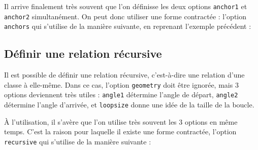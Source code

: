\documentclass[a4paper,11pt]{report}
\newcommand{\inputTikZ}[1]{%
  }%
\newcommand{\inputTikZ}[1]{%
    \texttt{[image: fig/\#1.pdf]}%
  }%
\begin{document}
\begin{center}
\inputTikZ{tikzanchor}
\end{center}

Il arrive finalement très souvent que l'on définisse les deux options {\tt anchor1} et {\tt anchor2} simultanément. On peut donc utiliser une forme contractée : l'option \hypertarget{anchors}{{\tt anchors}} qui s'utilise de la manière suivante, en reprenant l'exemple précédent :

\medskip

\begin{minipage}{0.6\textwidth}

\end{minipage}
\begin{minipage}{0.4\textwidth}
\begin{center}
\inputTikZ{relationanchors}
\end{center}
\end{minipage}

\subsection{Définir une relation récursive}\label{ss.relrec}

Il est possible de définir une relation récursive, c'est-à-dire une relation d'une classe à elle-même. Dans ce cas, l'option {\tt geometry} doit être ignorée, mais 3 options deviennent très utiles : {\tt angle1} détermine l'angle de départ, {\tt angle2} détermine l'angle d'arrivée, et {\tt loopsize} donne une idée de la taille de la boucle.

\medskip

\begin{minipage}{0.5\textwidth}

\end{minipage}
\begin{minipage}{0.4\textwidth}
\begin{center}
\inputTikZ{relationrec}
\end{center}
\end{minipage}

\medskip

\`{A} l'utilisation, il s'avère que l'on utilise très souvent les 3 options en même temps. C'est la raison pour laquelle il existe une forme contractée, l'option {\tt recursive} qui s'utilise de la manière suivante :

\medskip

\begin{minipage}{0.5\textwidth}

\end{minipage}
\begin{minipage}{0.4\textwidth}
\begin{center}
\inputTikZ{relationrec2}
\end{center}
\end{minipage}
\end{document}
